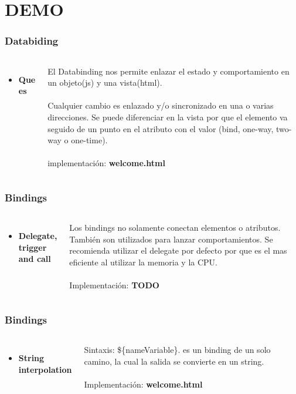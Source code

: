 \documentclass{beamer}
\begin{document}
\section{DEMO}
\begin{frame}
\frametitle{Databiding}
\begin{columns}[c]
\begin{itemize}
\item \textbf{Que es}
\end{itemize}
El Databinding nos permite enlazar el estado y comportamiento en un objeto(js) y una vista(html).
\\~\\
Cualquier cambio es enlazado y/o sincronizado en una o varias direcciones. Se puede diferenciar en la vista por que el elemento va seguido de un punto en el atributo con el valor (bind, one-way, two-way o one-time).
\\~\\
implementaci\'on: \textbf{welcome.html}
\end{columns}
\end{frame}
\begin{frame}
\frametitle{Bindings}
\begin{columns}[c]
\begin{itemize}
\item \textbf{Delegate, trigger and call}
\end{itemize}
Los bindings no solamente conectan elementos o atributos. Tambi\'en son utilizados para lanzar comportamientos.
Se recomienda utilizar el delegate por defecto por que es el mas eficiente al utilizar la memoria y la CPU.
\\~\\
Implementaci\'on: \textbf{TODO}
\end{columns}
\end{frame}
\begin{frame}
\frametitle{Bindings}
\begin{columns}[c]
\begin{itemize}
\item \textbf{String interpolation}
\end{itemize}
Sintaxis: \$\{nameVariable\}. es un binding de un solo camino, la cual la salida se convierte en un string.
\\~\\
Implementaci\'on: \textbf{welcome.html}
\end{columns}
\end{frame}
\end{document}
